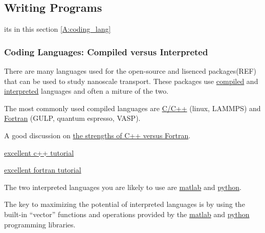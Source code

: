\subsection{\label{A:Comp_Env:Writing}Writing Programs}

its in this section \ref{A:coding_lang}

\subsubsection{\label{A:coding_lang}
Coding Languages: Compiled versus Interpreted}

There are many languages 
used for the open-source and lisenced packages(REF) that can be used 
to study nanoscale transport. These packages use 
\href{http://en.wikipedia.org/wiki/Compiled_language}{compiled} and 
\href{http://en.wikipedia.org/wiki/Interpreted_language}{interpreted}  
languages and often a miture of the two.

The most commonly used compiled languages are 
\href{https://en.wikipedia.org/wiki/C\%2B\%2B}{C/C++} 
(linux, LAMMPS) 
and 
\href{http://en.wikipedia.org/wiki/Fortran}{Fortran}
(GULP, quantum espresso, VASP).

A good discussion on 
\href{http://stackoverflow.com/questions/13078736/fortran-vs-c-does-fortran-still-hold-any-advantage-in-numerical-analysis-thes}
{the strengths of C++ versus Fortran}.

\href{http://www.youtube.com/watch?v=XFQ9dw3CyDo&list=PL1D10C030FDCE7CE0}
{excellent c++ tutorial}

\href{http://www.youtube.com/watch?v=YRTEOFMUTzw&list=PL6A8E21D2E86A0155}
{excellent fortran tutorial}


The two interpreted languages you are likely to use are 
\href{http://en.wikipedia.org/wiki/MATLAB}{matlab}  
and 
\href{http://en.wikipedia.org/wiki/Python_(programming_language)}{python}.

The key to maximizing the potential of interpreted languages is by 
using the built-in ``vector'' functions and operations provided by the 
\href{http://www.mathworks.com/help/matlab/matlab_prog/vectorization.html}
{matlab}  
and 
\href{http://faculty.washington.edu/rjl/uwamath583s11/sphinx/notes/html/python_vect.html}
{python}  
programming libraries.

